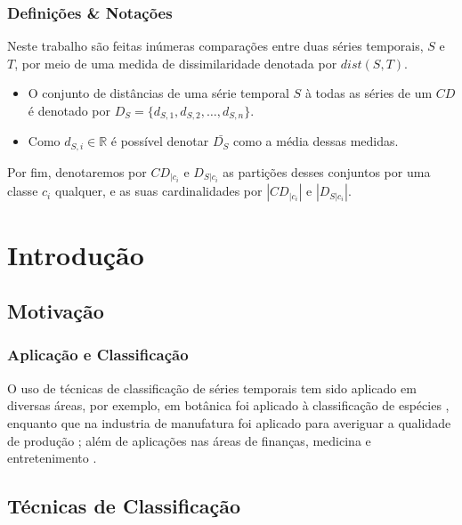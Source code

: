 \documentclass{beamer}
\begin{document}

\begin{frame}
\frametitle{Defini{\c c}{\~o}es \& Nota{\c c}{\~o}es}
Neste trabalho s{\~a}o feitas in{\'u}meras compara{\c c}{\~o}es entre duas s{\'e}ries temporais, $S$ e $T$, por meio de uma medida de dissimilaridade denotada por $dist(S, T)$.
\begin{itemize}
\item O conjunto de dist{\^a}ncias de uma s{\'e}rie temporal $S$ {\`a} todas as s{\'e}ries de um $CD$ {\'e} denotado por $D_{S} = \{d_{S,1}, d_{S,2}, \dots, d_{S,n}\}$.
\item Como $d_{S,i} \in \mathbb{R}$ {\'e} poss{\'i}vel denotar $\bar{D_{S}}$ como a m{\'e}dia dessas medidas.
\end{itemize}
Por fim, denotaremos por $CD_{|c_{i}}$ e $D_{S|c_{i}}$ as parti{\c c}{\~o}es desses conjuntos por uma classe $c_{i}$ qualquer, e as suas cardinalidades por $|CD_{|c_{i}}|$ e $|D_{S|c_{i}}|$.
\end{frame}

\section{Introdu{\c c}{\~a}o}

\subsection{Motiva{\c c}\~ao}

\begin{frame}
\frametitle{Aplica{\c c}{\~a}o e Classifica{\c c}{\~a}o}
O uso de t{\'e}cnicas de classifica{\c c}{\~a}o de s{\'e}ries temporais tem sido aplicado em diversas {\'a}reas, por exemplo, em bot{\^a}nica foi aplicado {\`a} classifica{\c c}{\~a}o de esp{\'e}cies \cite{Ye:2009do}, enquanto que na industria de manufatura foi aplicado para averiguar a qualidade de produ{\c c}{\~a}o \cite{Patri:2014cd}; al{\'e}m de aplica{\c c}{\~o}es nas {\'a}reas de finan{\c c}as, medicina e entretenimento \cite{xi:2006}.
\end{frame}


\subsection{T{\'e}cnicas de Classifica{\c c}{\~a}o}
\end{document}
